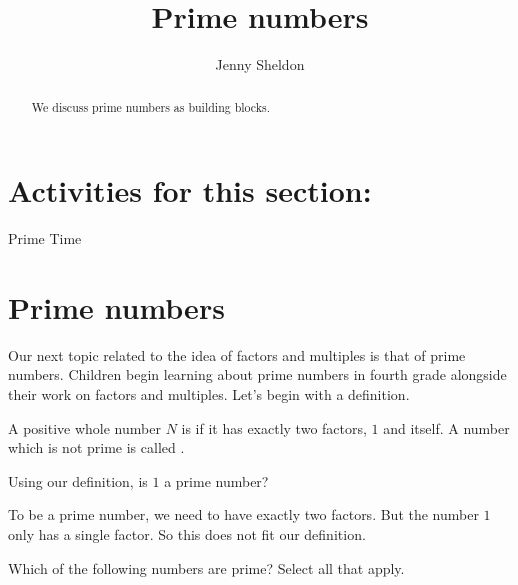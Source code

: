 \documentclass{ximera}
\title{Prime numbers}
\author{Jenny Sheldon}
\begin{document}
\begin{abstract}
We discuss prime numbers as building blocks.
\end{abstract}
\maketitle

\section{Activities for this section:} Prime Time

\section{Prime numbers}

Our next topic related to the idea of factors and multiples is that of prime numbers. Children begin learning about prime numbers in fourth grade alongside their work on factors and multiples. Let's begin with a definition.

\begin{definition}
A positive whole number $N$ is  if it has exactly two factors, $1$ and itself. A number which is not prime is called .
\end{definition}


\begin{question}
Using our definition, is $1$ a prime number?

\begin{multipleChoice}
\begin{feedback}[correct]
 To be a prime number, we need to have exactly two factors. But the number $1$ only has a single factor. So this does not fit our definition.
\end{feedback}
\end{multipleChoice}
\end{question}



\begin{question}
Which of the following numbers are prime? Select all that apply.
\begin{selectAll}
\end{selectAll}
\end{question}
\end{document}
